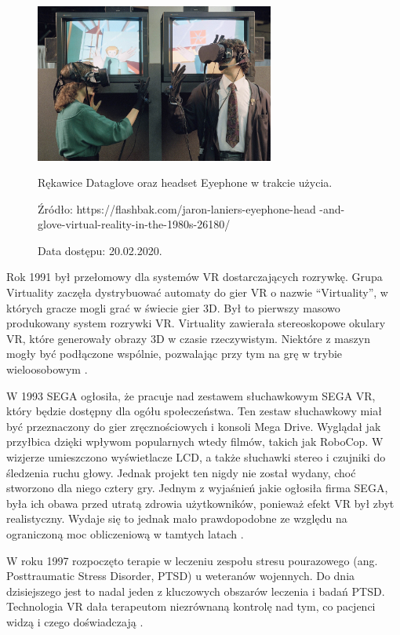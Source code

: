 \begin{figure}[ht]
	\centering
	\includegraphics[width=0.7\textwidth]{images/jaron.jpg}
	\caption{Rękawice Dataglove oraz headset Eyephone w trakcie użycia.}
	\caption*{Źródło: https://flashbak.com/jaron-laniers-eyephone-head
	-and-glove-virtual-reality-in-the-1980s-26180/}
	\caption*{Data dostępu: 20.02.2020.}
	\label{fig:eyephone}
\end{figure}

Rok 1991 był przełomowy dla systemów VR dostarczających rozrywkę. Grupa Virtuality zaczęła dystrybuować automaty do gier VR o nazwie ``Virtuality'', w których gracze mogli grać w świecie gier 3D. Był to pierwszy masowo produkowany system rozrywki VR. Virtuality zawierała stereoskopowe okulary VR, które generowały obrazy 3D w czasie rzeczywistym. Niektóre z maszyn mogły być podłączone wspólnie, pozwalając przy tym na grę w trybie wieloosobowym \citep{website:virtualspeech}.

W 1993 SEGA ogłosiła, że pracuje nad zestawem słuchawkowym SEGA VR, który będzie dostępny dla ogółu społeczeństwa. Ten zestaw słuchawkowy miał być przeznaczony do gier zręcznościowych i konsoli Mega Drive. Wyglądał jak przyłbica dzięki wpływom popularnych wtedy filmów, takich jak RoboCop. W wizjerze umieszczono wyświetlacze LCD, a także słuchawki stereo i czujniki do śledzenia ruchu głowy. Jednak projekt ten nigdy nie został wydany, choć stworzono dla niego cztery gry. Jednym z wyjaśnień jakie ogłosiła firma SEGA, była ich obawa przed utratą zdrowia użytkowników, ponieważ efekt VR był zbyt realistyczny. Wydaje się to jednak mało prawdopodobne ze względu na ograniczoną moc obliczeniową w tamtych latach \citep{website:virtualspeech}.

W roku 1997 rozpoczęto terapie w leczeniu zespołu stresu pourazowego (ang. Posttraumatic Stress Disorder, PTSD) u weteranów wojennych. Do dnia dzisiejszego jest to nadal jeden z kluczowych obszarów leczenia i badań PTSD. Technologia VR dała terapeutom niezrównaną kontrolę nad tym, co pacjenci widzą i czego doświadczają \citep{interactivemedia}.


